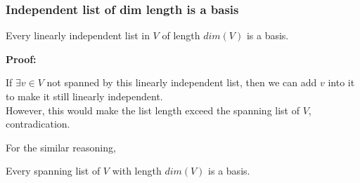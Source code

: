\documentclass{article}
\begin{document}
\subsubsection{Independent list of dim length is a basis}
\begin{addmargin}[1em]{0em}
    Every linearly independent list in $V$ of length $dim(V)$ is a basis.
\end{addmargin}
\textbf{Proof:}
\begin{addmargin}[1em]{0em}
    If $\exists v \in V$ not spanned by this linearly independent list, then we can add $v$ into it to make it still linearly independent.\\
    However, this would make the list length exceed the spanning list of $V$, contradication.
\end{addmargin}
For the similar reasoning,
\begin{addmargin}[1em]{0em}
    Every spanning list of $V$ with length $dim(V)$ is  a basis.
\end{addmargin}
\end{document}
